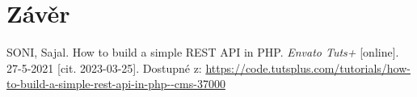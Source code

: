 \documentclass[titlepage]{article}
\begin{document}
\section*{Závěr}

\begin{thebibliography}{9}
    SONI, Sajal. How to build a simple REST API in PHP. \emph{En\-va\-to Tuts+} [on\-li\-ne]. 27-5-2021 [cit. 2023-03-25]. Dostupné z: \url{https://code.tutsplus.com/tutorials/how-to-build-a-simple-rest-api-in-php--cms-37000}
\end{thebibliography}
\end{document}
